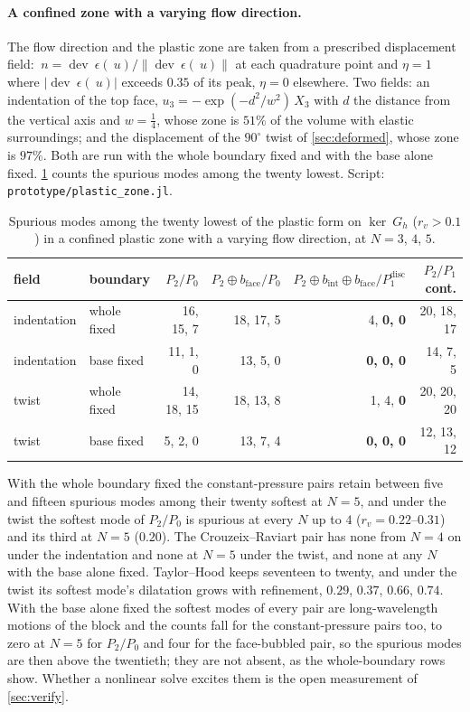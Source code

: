 \documentclass{article}
\newcommand{\eps}{~\epsilon}
\newcommand{\dev}{\operatorname{dev}}
\newcommand{\norm}[1]{\left\lVert #1 \right\rVert}
\newcommand{\code}[1]{\texttt{#1}}
\theoremstyle{definition}
\theoremstyle{plain}
\begin{document}
\paragraph{A confined zone with a varying flow direction.} The flow
direction and the plastic zone are taken from a prescribed displacement
field: $~n = \dev\eps(~u)/\norm{\dev\eps(~u)}$ at each quadrature point and
$\eta = 1$ where $\lvert\dev\eps(~u)\rvert$ exceeds $0.35$ of its peak,
$\eta = 0$ elsewhere. Two fields: an indentation of the top face,
$u_3 = -\exp(-d^2/w^2)\,X_3$ with $d$ the distance from the vertical axis and
$w = \tfrac14$, whose zone is $51\%$ of the volume with elastic
surroundings; and the displacement of the $90^\circ$ twist of
\cref{sec:deformed}, whose zone is $97\%$. Both are run with the whole
boundary fixed and with the base alone fixed. \cref{tab:zone} counts
the spurious modes among the twenty lowest. Script:
\code{prototype/plastic\_zone.jl}.

\begin{table}[tbp]
\centering
\caption{Spurious modes among the twenty lowest of the plastic form on
$\ker ~G_h$ ($r_v > 0.1$) in a confined plastic zone with a varying flow
direction, at $N = 3$, $4$, $5$.}
\label{tab:zone}
\begin{tabular}{@{}llrrrr@{}}
\toprule
field & boundary & $P_2/P_0$ & $P_2 \oplus b_{\mathrm{face}}/P_0$
      & $P_2 \oplus b_{\mathrm{int}} \oplus b_{\mathrm{face}}/P_1^{\mathrm{disc}}$
      & $P_2/P_1$ cont. \\
\midrule
indentation & whole fixed & 16, 15, 7  & 18, 17, 5  & 4, \textbf{0, 0} & 20, 18, 17 \\
indentation & base fixed & 11, 1, 0   & 13, 5, 0   & \textbf{0, 0, 0} & 14, 7, 5 \\
twist       & whole fixed & 14, 18, 15 & 18, 13, 8  & 1, 4, \textbf{0} & 20, 20, 20 \\
twist       & base fixed & 5, 2, 0    & 13, 7, 4   & \textbf{0, 0, 0} & 12, 13, 12 \\
\bottomrule
\end{tabular}
\end{table}

With the whole boundary fixed the constant-pressure pairs retain between
five and fifteen spurious modes among their twenty softest at $N = 5$, and
under the twist the softest mode of $P_2/P_0$ is spurious at every $N$ up to
$4$ ($r_v = 0.22$--$0.31$) and its third at $N = 5$ ($0.20$). The
Crouzeix--Raviart pair has none from $N = 4$ on under the indentation and
none at $N = 5$ under the twist, and none at any $N$ with the base alone
fixed. Taylor--Hood keeps seventeen to twenty, and under the twist its
softest mode's dilatation grows with refinement, $0.29$, $0.37$, $0.66$,
$0.74$. With the base alone fixed the softest modes of every pair are
long-wavelength motions of the block and the counts fall for the
constant-pressure pairs too, to zero at $N = 5$ for $P_2/P_0$ and four for
the face-bubbled pair, so the spurious modes are then above the twentieth;
they are not absent, as the whole-boundary rows show. Whether a nonlinear
solve excites them is the open measurement of \cref{sec:verify}.
\end{document}
